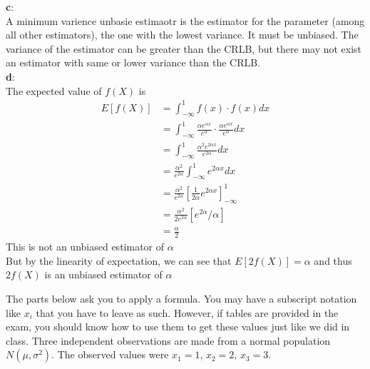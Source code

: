 \documentclass[answers,12pt,addpoints]{exam}
\begin{document}
\begin{questions}
\begin{solution}
        \textbf{c}:\\
        A minimum varience unbasie estimaotr is the estimator for the parameter (among all other estimators), the one with the lowest variance. It must be unbiased. The variance of the estimator can be greater than the CRLB, but there may not exist an estimator with same or lower variance than the CRLB.\\

        \textbf{d}:\\
        The expected value of $f(X)$ is
        \begin{align*}
            E[f(X)] &= \int_{-\infty}^{1} f(x) \cdot f(x) dx\\
            &= \int_{-\infty}^{1} \frac{\alpha e^{\alpha x}}{e^{\alpha}} \cdot \frac{\alpha e^{\alpha x}}{e^{\alpha}} dx\\
            &= \int_{-\infty}^{1} \frac{\alpha^2 e^{2\alpha x}}{e^{2\alpha}} dx\\
            &= \frac{\alpha^2}{e^{2\alpha}} \int_{-\infty}^{1} e^{2\alpha x} dx\\
            &= \frac{\alpha^2}{e^{2\alpha}} \left[ \frac{1}{2\alpha} e^{2\alpha x} \right]_{-\infty}^{1}\\
            &= \frac{\alpha^2}{2e^{2\alpha}} \left[ e^{2\alpha} / \alpha \right]\\
            &= \frac{\alpha}{2}
        \end{align*}
        This is not an unbiased estimator of $\alpha$\\
        But by the linearity of expectation, we can see that $E[2f(X)] = \alpha$ and thus $2f(X)$ is an unbiased estimator of $\alpha$

    \end{solution}

    \question[10] The parts below ask you to apply a formula. You may have a subscript notation like $x_i$ that you have to leave as such. However, if tables are provided in the exam, you should know how to use them to get these values just like we did in class. Three independent observations are made from a normal population $N(\mu, \sigma^2)$. The observed values were $x_1 = 1$, $x_2 = 2$, $x_3 = 3$.
\end{questions}
\end{document}
